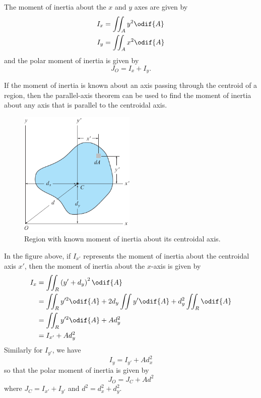 \documentclass{article}
\begin{document}
The moment of inertia about the \(x\) and \(y\) axes are given by
\begin{align*}
    I_x & = \iint_A y^2 \odif{A} \\
    I_y & = \iint_A x^2 \odif{A}
\end{align*}
and the polar moment of inertia is given by
\begin{equation*}
    J_O = I_x + I_y.
\end{equation*}
\begin{theorem}
    If the moment of inertia is known about an axis passing through the centroid of a region,
    then the parallel-axis theorem can be used to find the moment of inertia about any axis
    that is parallel to the centroidal axis.
    \begin{figure}[H]
        \centering
        \includegraphics[height = 6cm, keepaspectratio = true]{figures/parallel_axis_theorem.pdf}
        \caption{Region with known moment of inertia about its centroidal axis.} %
    \end{figure}
    In the figure above, if \(I_{x'}\) represents the moment of inertia about the centroidal axis \(x'\),
    then the moment of inertia about the \(x\)-axis is given by
    \begin{align*}
        I_x & = \iint_R \left( y' + d_y \right)^2 \odif{A}                               \\
            & = \iint_R y'^2 \odif{A} + 2 d_y \iint y' \odif{A} + d_y^2 \iint_R \odif{A} \\
            & = \iint_R y'^2 \odif{A} + A d_y^2                                          \\
            & = I_{x'} + A d_y^2
    \end{align*}
    Similarly for \(I_{y'}\), we have
    \begin{equation*}
        I_y = I_{y'} + A d_x^2
    \end{equation*}
    so that the polar moment of inertia is given by
    \begin{equation*}
        J_O = J_C + Ad^2
    \end{equation*}
    where \(J_C = I_{x'} + I_{y'}\) and \(d^2 = d_x^2 + d_y^2\).
\end{theorem}
\end{document}
